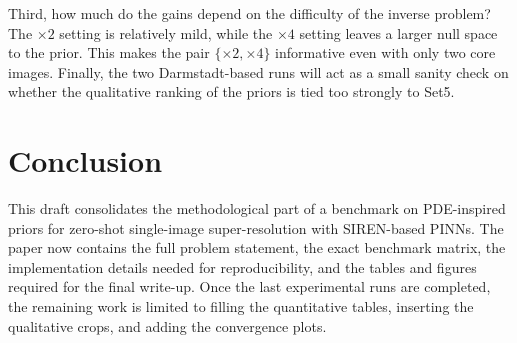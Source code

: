 \documentclass[conference]{IEEEtran}
\begin{document}
Third, how much do the gains depend on the difficulty of the inverse
problem? The $\times 2$ setting is relatively mild, while the
$\times 4$ setting leaves a larger null space to the prior. This makes
the pair $\{\times 2,\times 4\}$ informative even with only two core
images. Finally, the two Darmstadt-based runs will act as a small
sanity check on whether the qualitative ranking of the priors is tied
too strongly to Set5.

\section{Conclusion}
This draft consolidates the methodological part of a benchmark on
PDE-inspired priors for zero-shot single-image super-resolution with
SIREN-based PINNs. The paper now contains the full problem statement,
the exact benchmark matrix, the implementation details needed for
reproducibility, and the tables and figures required for the final
write-up. Once the last experimental runs are completed, the remaining
work is limited to filling the quantitative tables, inserting the
qualitative crops, and adding the convergence plots.
\end{document}
